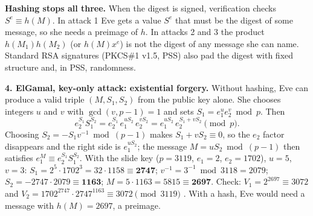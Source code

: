 \textbf{Hashing stops all three.} When the digest is signed, verification checks $S^e \equiv h(M)$. In attack 1 Eve gets a value $S^e$ that must be the digest of some message, so she needs a preimage of $h$. In attacks 2 and 3 the product $h(M_1) h(M_2)$ (or $h(M) x^e$) is not the digest of any message she can name. Standard RSA signatures (PKCS\#1 v1.5, PSS) also pad the digest with fixed structure and, in PSS, randomness.

\textbf{4. ElGamal, key-only attack: existential forgery.} Without hashing, Eve can produce a valid triple $(M, S_1, S_2)$ from the public key alone. She chooses integers $u$ and $v$ with $\gcd(v, p-1) = 1$ and sets $S_1 = e_1^u e_2^v \bmod p$. Then
\[
e_2^{S_1} S_1^{S_2} = e_2^{S_1}\, e_1^{u S_2}\, e_2^{v S_2} = e_1^{u S_2}\, e_2^{S_1 + v S_2} \pmod p .
\]
Choosing $S_2 = -S_1 v^{-1} \bmod (p-1)$ makes $S_1 + v S_2 \equiv 0$, so the $e_2$ factor disappears and the right side is $e_1^{u S_2}$; the message $M = u S_2 \bmod (p-1)$ then satisfies $e_1^M \equiv e_2^{S_1} S_1^{S_2}$. With the slide key ($p = 3119$, $e_1 = 2$, $e_2 = 1702$), $u = 5$, $v = 3$: $S_1 = 2^5 \cdot 1702^3 = 32 \cdot 1158 \equiv \mathbf{2747}$; $v^{-1} = 3^{-1} \bmod 3118 = 2079$; $S_2 = -2747 \cdot 2079 \equiv \mathbf{1163}$; $M = 5 \cdot 1163 = 5815 \equiv \mathbf{2697}$. Check: $V_1 = 2^{2697} \equiv 3072$ and $V_2 = 1702^{2747} \cdot 2747^{1163} \equiv 3072 \pmod{3119}$ \checkmark. With a hash, Eve would need a message with $h(M) = 2697$, a preimage.

